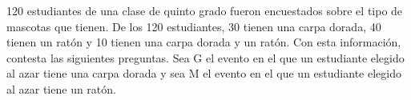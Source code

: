 120 estudiantes de una clase de quinto grado fueron encuestados sobre el tipo de mascotas que tienen.
De los 120 estudiantes, 30 tienen una carpa dorada, 40 tienen un ratón y 10 tienen una carpa dorada y un ratón.
Con esta información, contesta las siguientes preguntas.
Sea G el evento en el que un estudiante elegido al azar tiene una carpa dorada y sea M el evento en el que un
estudiante elegido al azar tiene un ratón.
